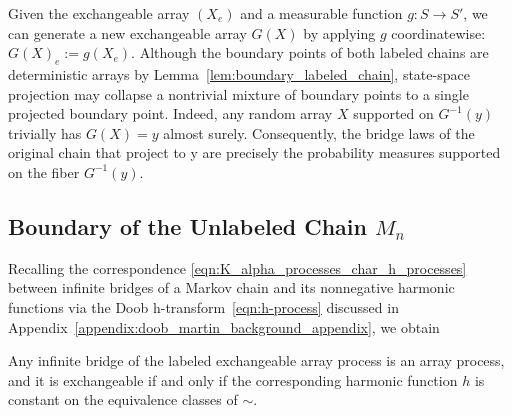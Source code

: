 \noindent Given the exchangeable array $(X_e)$ and a measurable function $g:S \to S'$, we can generate a new exchangeable
array $G(X)$ by applying $g$ coordinatewise: $G(X)_e := g(X_e)$. Although the boundary points of both labeled chains are deterministic arrays by Lemma~\ref{lem:boundary_labeled_chain},
state-space projection may collapse a nontrivial mixture of boundary points to a single projected boundary point. Indeed, any random array $X$ supported on $G^{-1}(y)$
trivially has $G(X) = y$ almost surely. Consequently, the bridge laws of the
original chain that project to y are precisely the probability measures supported on the fiber $G^{-1}(y)$.

\subsection{Boundary of the Unlabeled Chain $M_n$}

\noindent
Recalling the correspondence \eqref{eqn:K_alpha_processes_char_h_processes} between infinite
 bridges of a Markov chain and its nonnegative harmonic functions via the Doob
 h-transform~\eqref{eqn:h-process} discussed in Appendix~\ref{appendix:doob_martin_background_appendix},
 we obtain

\begin{lemma}
\label{lem:harmonic_functions_labeled}
    Any infinite bridge of the labeled exchangeable array process is an array
    process, and it is exchangeable if and only if the corresponding harmonic
    function $h$ is constant on the equivalence classes of $\sim$.

\end{lemma}


